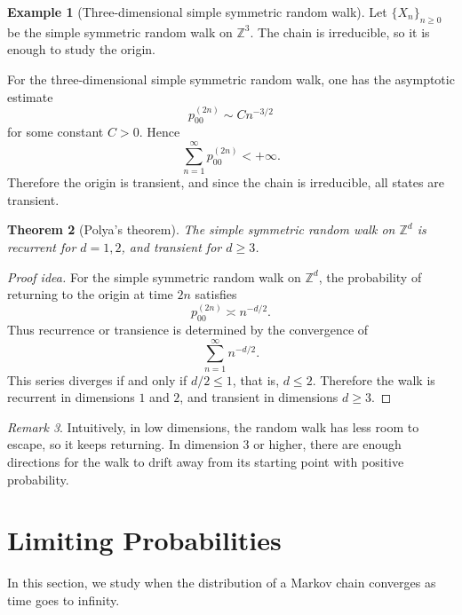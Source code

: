 \documentclass[11pt]{article}
\theoremstyle{plain}
\newtheorem{theorem}{Theorem}[section]
\theoremstyle{definition}
\newtheorem{example}[theorem]{Example}
\theoremstyle{remark}
\newtheorem{remark}[theorem]{Remark}
\begin{document}
\begin{example}[Three-dimensional simple symmetric random walk]
	Let \(\{X_n\}_{n\ge 0}\) be the simple symmetric random walk on \(\mathbb{Z}^3\). The chain is irreducible, so it is enough to study the origin.
	
	For the three-dimensional simple symmetric random walk, one has the asymptotic estimate
	\[
	p_{00}^{(2n)}
	\sim
	Cn^{-3/2}
	\]
	for some constant \(C>0\). Hence
	\[
	\sum_{n=1}^{\infty}p_{00}^{(2n)}<+\infty.
	\]
	Therefore the origin is transient, and since the chain is irreducible, all states are transient.
\end{example}

\begin{theorem}[Polya's theorem]
	The simple symmetric random walk on \(\mathbb{Z}^d\) is recurrent for \(d=1,2\), and transient for \(d\ge 3\).
\end{theorem}

\begin{proof}[Proof idea]
	For the simple symmetric random walk on \(\mathbb{Z}^d\), the probability of returning to the origin at time \(2n\) satisfies
	\[
	p_{00}^{(2n)}
	\asymp
	n^{-d/2}.
	\]
	Thus recurrence or transience is determined by the convergence of
	\[
	\sum_{n=1}^{\infty}n^{-d/2}.
	\]
	This series diverges if and only if \(d/2\le 1\), that is, \(d\le 2\). Therefore the walk is recurrent in dimensions \(1\) and \(2\), and transient in dimensions \(d\ge 3\).
\end{proof}

\begin{remark}
	Intuitively, in low dimensions, the random walk has less room to escape, so it keeps returning. In dimension \(3\) or higher, there are enough directions for the walk to drift away from its starting point with positive probability.
\end{remark}


	
	
	
	
	
	\section{Limiting Probabilities}
	
	In this section, we study when the distribution of a Markov chain converges as time goes to infinity.
	
\end{document}
